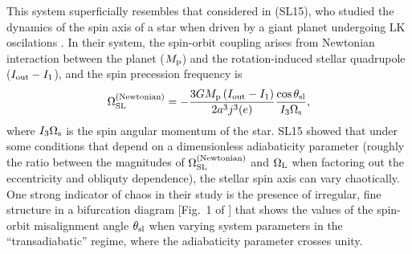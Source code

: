 \documentclass[
        twocolumn,
        twocolappendix
    ]{aastex63}
\newcommand*{\p}[1]{\left(#1\right)}
\begin{document}
This system superficially resembles that considered in \citet{storch} (SL15),
who studied the dynamics of the spin axis of a star when driven by a giant
planet undergoing LK oscilations \citep[see also][]{storch2014chaotic,
storch2017dynamics}. In their system, the spin-orbit coupling arises from
Newtonian interaction between the planet ($M_{\rm p}$) and the rotation-induced
stellar quadrupole ($I_{\rm out}-I_1$), and the spin precession frequency is
\begin{equation}
    \Omega_{\rm SL}^{\rm (Newtonian)} = -\frac{3GM_{\rm p} \p{I_{\rm out} -
        I_1}}{ 2a^3j^3(e)}\frac{\cos \theta_{\rm sl}}{I_3 \Omega_{\rm s}},
\end{equation}
where $I_3 \Omega_{\rm s}$ is the spin angular momentum of the star. SL15 showed
that under some conditions that depend on a dimensionless adiabaticity parameter
(roughly the ratio between the magnitudes of $\Omega_{\rm SL}^{\rm (Newtonian)}$
and $\Omega_{\rm L}$ when factoring out the eccentricity and obliquty
dependence), the stellar spin axis can vary chaotically. One strong indicator of
chaos in their study is the presence of irregular, fine structure in a
bifurcation diagram [Fig.~1 of \citet{storch}] that shows the values of the
spin-orbit misalignment angle $\theta_{\rm sl}$ when varying system parameters
in the ``transadiabatic'' regime, where the adiabaticity parameter crosses
unity.
\end{document}

